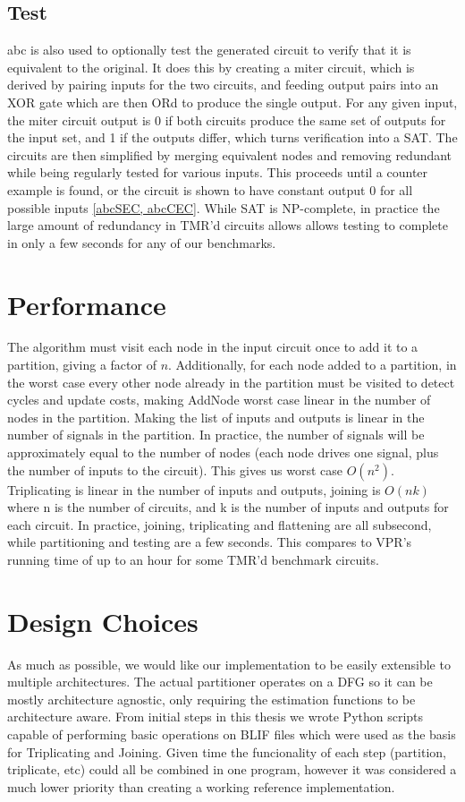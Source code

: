 \documentclass[12pt,final,oneside]{dwThesis} %
\begin{document}
   \subsection{Test}\label{algTest}
   abc is also used to optionally test the generated circuit to verify that it is equivalent to the original. It does this by creating a miter circuit, which is derived by pairing inputs for the two circuits, and feeding output pairs into an XOR gate which are then ORd to produce the single output. For any given input, the miter circuit output is 0 if both circuits produce the same set of outputs for the input set, and 1 if the outputs differ, which turns verification into a \ac{SAT}.
   The circuits are then simplified by merging equivalent nodes and removing redundant while being regularly tested for various inputs. This proceeds until a counter example is found, or the circuit is shown to have constant output 0 for all possible inputs \ref{abcSEC, abcCEC}.
   While \ac{SAT} is NP-complete, in practice the large amount of redundancy in TMR'd circuits allows allows testing to complete in only a few seconds for any of our benchmarks.

   \section{Performance}
   The algorithm must visit each node in the input circuit once to add it to a partition, giving a factor of $n$.
   Additionally, for each node added to a partition, in the worst case every other node already in the partition must be visited to detect cycles and update costs, making AddNode worst case linear in the number of nodes in the partition.
   Making the list of inputs and outputs is linear in the number of signals in the partition. In practice, the number of signals will be approximately equal to the number of nodes (each node drives one signal, plus the number of inputs to the circuit).
   This gives us worst case $O(n^2)$.
   Triplicating is linear in the number of inputs and outputs, joining is $O(nk)$ where n is the number of circuits, and k is the number of inputs and outputs for each circuit. 
   In practice, joining, triplicating and flattening are all subsecond, while partitioning and testing are a few seconds. This compares to \ac{VPR}'s running time of up to an hour for some \ac{TMR}'d benchmark circuits.


   \section{Design Choices}
   As much as possible, we would like our implementation to be easily extensible to multiple architectures. The actual partitioner operates on a \ac{DFG} so it can be mostly architecture agnostic, only requiring the estimation functions to be architecture aware.
   From initial steps in this thesis we wrote Python scripts capable of performing basic operations on \ac{BLIF} files which were used as the basis for Triplicating and Joining. Given time the funcionality of each step (partition, triplicate, etc) could all be combined in one program, however it was considered a much lower priority than creating a working reference implementation.
\end{document}
